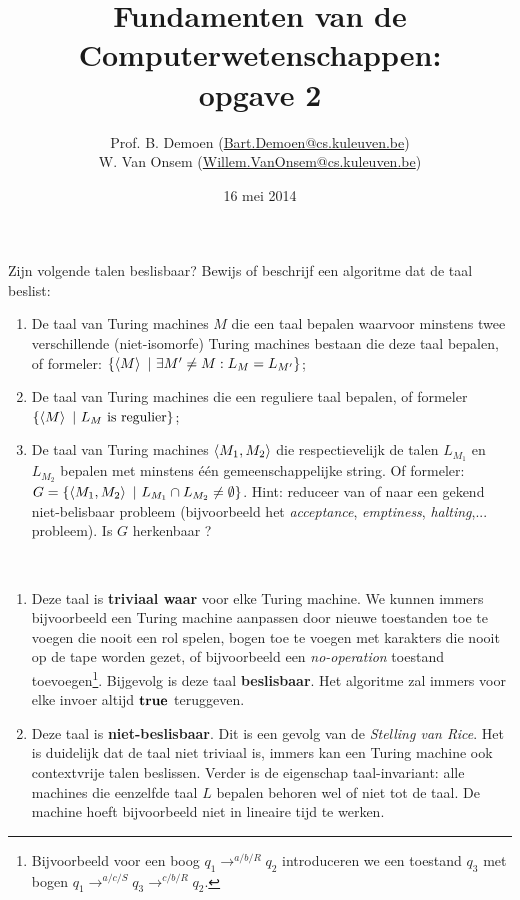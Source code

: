 \documentclass{article}
\title{Fundamenten van de Computerwetenschappen:\\opgave 2}
\author{Prof. B. Demoen (\url{Bart.Demoen@cs.kuleuven.be})\\ W. Van Onsem (\url{Willem.VanOnsem@cs.kuleuven.be})}
\date{16 mei 2014}
\begin{document}
\maketitle

\richtlijnen{}

\begin{question}[Beslisbaarheid]
Zijn volgende talen beslisbaar? Bewijs of beschrijf een algoritme dat de taal beslist:
\begin{enumerate}
 \item De taal van Turing machines $M$ die een taal bepalen waarvoor
minstens twee verschillende (niet-isomorfe) Turing machines bestaan
die deze taal bepalen, of formeler: $\left\{ \left\langle M \right\rangle\ |\ \exists
M'\neq M:L_M=L_{M'} \right\}$;
 \item De taal van Turing machines die een reguliere taal bepalen,
of formeler $\left\{ \left\langle M \right\rangle\ |\ L_M\mbox{ is regulier} \right\}$;
 \item De taal van Turing machines $\left\langle M_1,M_2 \right\rangle$ die
respectievelijk de talen $L_{M_1}$ en $L_{M_2}$ bepalen met minstens
\'{e}\'{e}n gemeenschappelijke string. Of formeler:
$G=\left\{ \left\langle M_1,M_2 \right\rangle\ |\ L_{M_1}\cap L_{M_2}\neq\emptyset \right\}$. Hint:
reduceer van of naar een gekend niet-belisbaar probleem (bijvoorbeeld het
\emph{acceptance}, \emph{emptiness}, \emph{halting},... probleem). Is $G$ herkenbaar ?
\end{enumerate}
\begin{answer}
~~
\begin{enumerate}
 \item Deze taal is \textbf{triviaal waar} voor elke Turing machine. We kunnen immers bijvoorbeeld een Turing machine aanpassen door nieuwe toestanden toe te voegen die nooit een rol spelen, bogen toe te voegen met karakters die nooit op de tape worden gezet, of bijvoorbeeld een \emph{no-operation} toestand toevoegen\footnote{Bijvoorbeeld voor een boog $q_1\rightarrow^{a/b/R} q_2$ introduceren we een toestand $q_3$ met bogen $q_1\rightarrow^{a/c/S}q_3\rightarrow^{c/b/R}q_2$.}. Bijgevolg is deze taal \textbf{beslisbaar}. Het algoritme zal immers voor elke invoer altijd $\mbox{\bf true}$ teruggeven.
 \item Deze taal is \textbf{niet-beslisbaar}. Dit is een gevolg van de \emph{Stelling van Rice}. Het is duidelijk dat de taal niet triviaal is, immers kan een Turing machine ook contextvrije talen beslissen. Verder is de eigenschap taal-invariant: alle machines die eenzelfde taal $L$ bepalen behoren wel of niet tot de taal. De machine hoeft bijvoorbeeld niet in lineaire tijd te werken.

\end{enumerate}
\end{answer}
\end{question}
\end{document}
